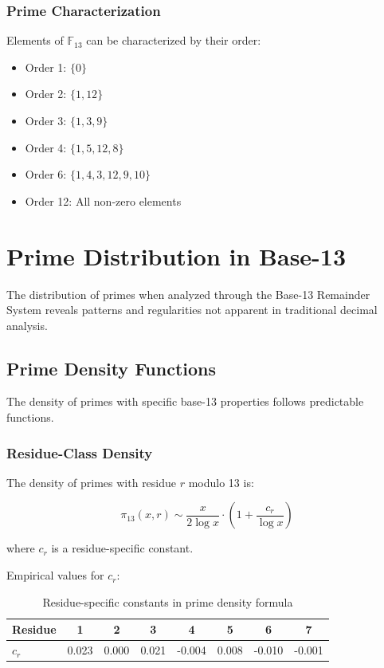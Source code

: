 \documentclass[12pt,a4paper]{report}
\begin{document}
\subsection{Prime Characterization}

Elements of $\mathbb{F}_{13}$ can be characterized by their order:

\begin{itemize}
\item Order 1: $\{0\}$
\item Order 2: $\{1, 12\}$
\item Order 3: $\{1, 3, 9\}$
\item Order 4: $\{1, 5, 12, 8\}$
\item Order 6: $\{1, 4, 3, 12, 9, 10\}$
\item Order 12: All non-zero elements
\end{itemize}

\chapter{Prime Distribution in Base-13}

The distribution of primes when analyzed through the Base-13 Remainder System reveals patterns and regularities not apparent in traditional decimal analysis.

\section{Prime Density Functions}

The density of primes with specific base-13 properties follows predictable functions.

\subsection{Residue-Class Density}

The density of primes with residue $r$ modulo 13 is:

\[
\pi_{13}(x, r) \sim \frac{x}{2 \log x} \cdot \left(1 + \frac{c_r}{\log x}\right)
\]

where $c_r$ is a residue-specific constant.

Empirical values for $c_r$:

\begin{table}[h]
\centering
\begin{tabular}{|l|c|c|c|c|c|c|c|}
\hline
\textbf{Residue} & 1 & 2 & 3 & 4 & 5 & 6 & 7 \\
\hline
$c_r$ & 0.023 & 0.000 & 0.021 & -0.004 & 0.008 & -0.010 & -0.001 \\
\hline
\end{tabular}
\caption{Residue-specific constants in prime density formula}
\end{table}
\end{document}
